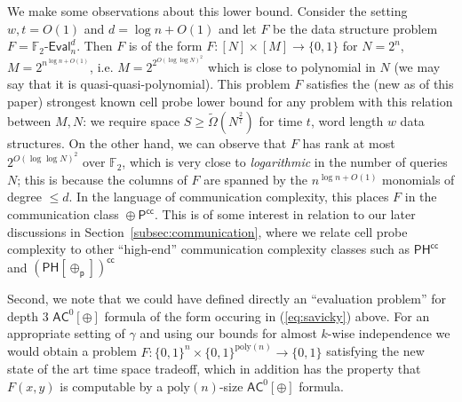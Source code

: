 \documentclass[11pt]{article}
\newcommand{\dash}{\text{-}}
\newcommand{\B}{\{0,1\}}
\newcommand{\poly}{\mathrm{poly}}
\begin{document}
We make some observations about this lower bound. Consider the setting $w,t=O(1)$ and $d = \log n + O(1)$ and let $F$ be the data structure problem $F = \mathbb{F}_2\dash\mathsf{Eval}_n^d$.  Then $F$ is of the form $F: [N] \times [M] \to \B$ for $N = 2^n$, $M = 2^{n^{\log n + O(1)}}$, i.e. $M = 2^{2^{O(\log\log N)^2}}$ which is close to polynomial in $N$ (we may say that it is quasi-quasi-polynomial). 
This problem $F$ satisfies the (new as of this paper) strongest known cell probe lower bound for any problem with this relation between $M,N$: we require space $S \geq \tilde{\Omega}(N^{\frac{2}{t}})$ for time $t$, word length $w$ data structures.
On the other hand, we can observe that $F$ has rank at most $2^{O(\log \log N)^2}$ over $\mathbb{F}_2$, which is very close to \emph{logarithmic} in the number of queries $N$; this is because the columns of $F$ are spanned by the $n^{\log n + O(1)}$ monomials of degree $\leq d$. In the language of communication complexity, this places $F$ in the communication class $\mathop{\oplus}\mathsf{P^{cc}}$. This is of some interest in relation to our later discussions in Section~\ref{subsec:communication}, where we relate cell probe complexity to other ``high-end'' communication complexity classes such as $\mathsf{PH^{cc}}$ and $\mathsf{(PH[\oplus_p])^{cc}}$

Second, we note that we could have defined directly an ``evaluation problem'' for depth 3 $\mathsf{AC}^0[\oplus]$ formula of the form occuring in (\ref{eq:savicky}) above. For an appropriate setting of $\gamma$ and using our bounds for almost $k$-wise independence we would obtain a problem $F: \B^n \times \B^{\poly(n)} \to \B$ satisfying the new state of the art time space tradeoff, which in addition has the property that $F(x,y)$ is computable by a $\poly(n)$-size $\mathsf{AC}^0[\oplus]$ formula.
\end{document}
